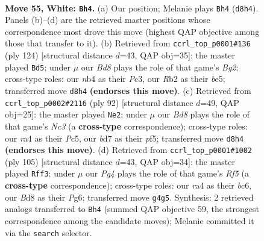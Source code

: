 \documentclass[11pt]{article}
\begin{document}
\clearpage

\begin{figure}[p]\centering
\begin{subfigure}{0.46\textwidth}\centering
\resizebox{\linewidth}{!}{%
\newchessgame
\chessboard[
  setfen={1R1B4/3b4/2r3k1/1p6/rn4P1/4P2p/1R3P2/7K w - - 1 55},
  showmover=false,
  pgfstyle=straightmove, color=movearrow, markmove={d8-h4}
]}
\caption{}
\end{subfigure}\hfill
\begin{subfigure}{0.46\textwidth}\centering
\resizebox{\linewidth}{!}{%
\newchessgame
\chessboard[
  setfen={1rr5/8/1k1p2R1/p3b3/8/K1P5/1P4B1/3R4 w - - 32 63},
  showmover=false,
  pgfstyle=straightmove, color=movearrow, markmove={g2-d5}
]}
\caption{}
\end{subfigure}
\\[4pt]
\begin{subfigure}{0.46\textwidth}\centering
\resizebox{\linewidth}{!}{%
\newchessgame
\chessboard[
  setfen={1r5r/R1pkn3/8/2P2p2/8/2N3P1/8/4R1K1 w - - 1 47},
  showmover=false,
  pgfstyle=straightmove, color=movearrow, markmove={c3-e2}
]}
\caption{}
\end{subfigure}\hfill
\begin{subfigure}{0.46\textwidth}\centering
\resizebox{\linewidth}{!}{%
\newchessgame
\chessboard[
  setfen={8/P3k3/2Bp2p1/1NpP2P1/4br2/1r6/4K3/4R3 b - - 2 53},
  showmover=false,
  pgfstyle=straightmove, color=movearrow, markmove={f4-f3}
]}
\caption{}
\end{subfigure}
\caption{\textbf{Move 55, White: \texttt{Bh4}.} (a) Our position; Melanie plays \texttt{Bh4} (\texttt{d8h4}). Panels (b)--(d) are the retrieved master positions whose correspondence most drove this move (highest QAP objective among those that transfer to it). (b) Retrieved from \texttt{ccrl\_top\_p0001\#136} (ply 124) [structural distance $d$=43, QAP obj=35]: the master played \texttt{Bd5}; under $\mu$ our \emph{Bd8} plays the role of that game's \emph{Bg2}; cross-type roles: our \emph{n}b4 as their \emph{P}c3, our \emph{R}b2 as their \emph{b}e5; transferred move \texttt{d8h4} \textbf{(endorses this move)}. (c) Retrieved from \texttt{ccrl\_top\_p0002\#2116} (ply 92) [structural distance $d$=49, QAP obj=25]: the master played \texttt{Ne2}; under $\mu$ our \emph{Bd8} plays the role of that game's \emph{Nc3} (a \textbf{cross-type} correspondence); cross-type roles: our \emph{r}a4 as their \emph{P}c5, our \emph{b}d7 as their \emph{p}f5; transferred move \texttt{d8h4} \textbf{(endorses this move)}. (d) Retrieved from \texttt{ccrl\_top\_p0001\#1002} (ply 105) [structural distance $d$=43, QAP obj=34]: the master played \texttt{Rff3}; under $\mu$ our \emph{Pg4} plays the role of that game's \emph{Rf5} (a \textbf{cross-type} correspondence); cross-type roles: our \emph{r}a4 as their \emph{b}c6, our \emph{B}d8 as their \emph{P}g6; transferred move \texttt{g4g5}. Synthesis: 2 retrieved analogs transferred to \texttt{Bh4} (summed QAP objective 59, the strongest correspondence among the candidate moves); Melanie committed it via the \texttt{search} selector.}
\label{fig:thought-m108}
\end{figure}
\end{document}

